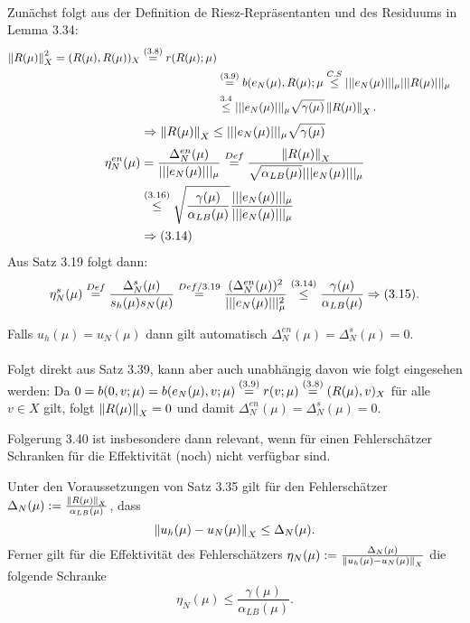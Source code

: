 \\
Zunächst folgt aus der Definition de Riesz-Repräsentanten und des Residuums in Lemma 3.34:
\begin{align*}
\left\Vert R(\mu)\right\Vert_X^2 = (R(\mu),R(\mu))_X \stackrel{(3.8)}{=} r(R(\mu);\mu)\\
&\stackrel{(3.9)}{=} b(e_N(\mu),R(\mu);\mu \stackrel{C.S}{\le} |||e_N(\mu)|||_\mu |||R(\mu)|||_\mu\\
&\stackrel{3.4}{\le} |||e_N(\mu)|||_\mu \sqrt{\gamma(\mu)}\left\Vert R(\mu)\right\Vert_X.
\end{align*}
\begin{align}
\Rightarrow \left\Vert R(\mu)\right\Vert_X \le |||e_N(\mu)|||_\mu \sqrt{\gamma(\mu)}
\end{align}
\begin{align*}
\eta_N^{en}(\mu) &= \frac{\Delta_N^{en}(\mu)}{|||e_N(\mu)|||_\mu} \stackrel{Def}{=} \frac{\left\Vert R(\mu)\right\Vert_X}{\sqrt{\alpha_{LB}(\mu)}|||e_N(\mu)|||_\mu}\\
&\stackrel{(3.16)}{\le} \sqrt{\frac{\gamma(\mu)}{\alpha_{LB}(\mu)}} \frac{|||e_N(\mu)|||_\mu}{|||e_N(\mu)|||_\mu}\\
&\Rightarrow (3.14)
\end{align*}
Aus Satz 3.19 folgt dann:
\begin{align*}
\eta_N^s(\mu)\stackrel{Def}{=} \frac{\Delta_N^s(\mu)}{s_h(\mu)s_N(\mu)} \stackrel{Def/3.19}{=} \frac{(\Delta_N^{en}(\mu))^2}{|||e_N(\mu)|||_\mu^2} \stackrel{(3.14)}{\le} \frac{\gamma(\mu)}{\alpha_{LB}(\mu)} \Rightarrow (3.15).
\end{align*}

Falls $u_h(\mu) = u_N(\mu)$ dann gilt automatisch $\Delta_N^{en}(\mu) = \Delta_N^s(\mu) = 0$.\\

\\
Folgt direkt aus Satz 3.39, kann aber auch unabhängig davon wie folgt eingesehen werden:
Da $0=b(0,v;\mu) = b(e_N(\mu),v;\mu) \stackrel{(3.9)}{=} r(v;\mu) \stackrel{(3.8)}{=} (R(\mu),v)_X$ für alle $v\in X$ gilt, folgt $\left\Vert R(\mu)\right\Vert_X=0$ und damit $\Delta_N^{en}(\mu) = \Delta_N^s(\mu) = 0$.

Folgerung 3.40 ist insbesondere dann relevant, wenn für einen Fehlerschätzer Schranken für die Effektivität (noch) nicht verfügbar sind.

Unter den Voraussetzungen von Satz 3.35 gilt für den Fehlerschätzer $\Delta_N(\mu) := \frac{\left\Vert R(\mu)\right\Vert_X}{\alpha_{LB}(\mu)}$, dass 
\[
\left\Vert u_h(\mu)-u_N(\mu)\right\Vert_X \le \Delta_N(\mu).
\] 
Ferner gilt für die Effektivität des Fehlerschätzers $\eta_N(\mu) := \frac{\Delta_N(\mu)}{\left\Vert u_h(\mu)-u_N(\mu)\right\Vert_X}$ die folgende Schranke
\[
\eta_N(\mu) \le \frac{\gamma(\mu)}{\alpha_{LB}(\mu)}.
\]

